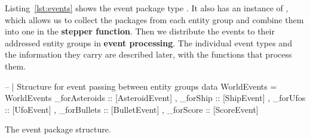 \documentclass[
  digital, %
  color,   %
  table,   %
  oneside, %
  lof,     %
  lot,     %
]{fithesis3}
\begin{document}
Listing~\ref{lst:events} shows the event package type .
It also has an instance of , which allows us to collect the packages from
each entity group and combine them into one in the \textbf{stepper function}.
Then we distribute the events to their addressed entity groups in \textbf{event processing}.
The individual event types and the information they carry are described later,
with the functions that process them.

\begin{listing}[H]
\begin{haskell}
-- | Structure for event passing between entity groups
data WorldEvents =
    WorldEvents
    { _forAsteroids :: [AsteroidEvent]
    , _forShip      :: [ShipEvent]
    , _forUfos      :: [UfoEvent]
    , _forBullets   :: [BulletEvent]
    , _forScore     :: [ScoreEvent]
    }
\end{haskell}
\caption{The event package structure.}
\label{lst:events}
\end{listing}


\end{document}
